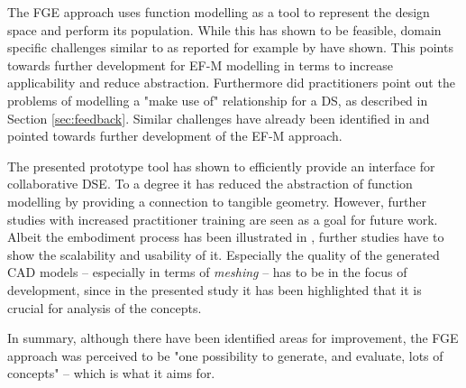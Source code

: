 \documentclass[preprints,article,accept,moreauthors,pdftex]{Definitions/mdpi}
\begin{document}
The \ac{FGE} approach uses function modelling as a tool to represent the design space and perform its population.
While this has shown to be feasible, domain specific challenges similar to as reported for example by \cite{Tomiyama2013} have shown.
This points towards further development for \ac{EF-M} modelling in terms to increase applicability and reduce abstraction.
Furthermore did practitioners point out the problems of modelling a "make use of" relationship for a \ac{DS}, as described in Section \ref{sec:feedback}. Similar challenges have already been identified in \cite{Muller2020} and pointed towards further development of the \ac{EF-M} approach.

The presented prototype tool has shown to efficiently provide an interface for collaborative \ac{DSE}. 
To a degree it has reduced the abstraction of function modelling by providing a connection to tangible geometry. 
However, further studies with increased practitioner training are seen as a goal for future work.
Albeit the embodiment process has been illustrated in \cite{Muller2020a}, further studies have to show the scalability and usability of it.
Especially the quality of the generated CAD models -- especially in terms of \textit{meshing} -- has to be in the focus of development, since in the presented study it has been highlighted that it is crucial for analysis of the concepts.

In summary, although there have been identified areas for improvement, the \ac{FGE} approach was perceived to be "one possibility to generate, and evaluate, lots of concepts" -- which is what it aims for.


\vspace{6pt} 
\end{document}
